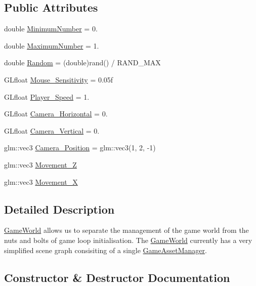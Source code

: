 \subsection*{Public Attributes}
\begin{DoxyCompactItemize}
\item 
double \hyperlink{classGameWorld_a54ccf4cf03172ab8779e9c326c8846ed}{Minimum\+Number} = 0.
\item 
double \hyperlink{classGameWorld_a1cddcf233625a98581eaeb9fd7c8c574}{Maximum\+Number} = 1.
\item 
double \hyperlink{classGameWorld_a56652cc9880b3ba1be61395066c863c3}{Random} = (double)rand() / R\+A\+N\+D\+\_\+\+M\+A\+X
\item 
G\+Lfloat \hyperlink{classGameWorld_a9bf4eb977e6ab9299aaef1345c4fa4dd}{Mouse\+\_\+\+Sensitivity} = 0.\+05f
\item 
G\+Lfloat \hyperlink{classGameWorld_ae8ab2ac372729cec44ea316f6bdf45ca}{Player\+\_\+\+Speed} = 1.
\item 
G\+Lfloat \hyperlink{classGameWorld_a7f4911dda9b3b4e4eb03ece87e16cd96}{Camera\+\_\+\+Horizontal} = 0.
\item 
G\+Lfloat \hyperlink{classGameWorld_a26658e739c4d267b1be35ed820089931}{Camera\+\_\+\+Vertical} = 0.
\item 
glm\+::vec3 \hyperlink{classGameWorld_ad80e597474ea4c52a583e81788187571}{Camera\+\_\+\+Position} = glm\+::vec3(1, 2, -\/1)
\item 
glm\+::vec3 \hyperlink{classGameWorld_a8dd30ba92e7fa9b9b05075e31d1e7dd8}{Movement\+\_\+\+Z}
\item 
glm\+::vec3 \hyperlink{classGameWorld_a968eb29424b68f7cd79a5896c62e944d}{Movement\+\_\+\+X}
\end{DoxyCompactItemize}


\subsection{Detailed Description}
\hyperlink{classGameWorld}{Game\+World} allows us to separate the management of the game world from the nuts and bolts of game loop initialisation. The \hyperlink{classGameWorld}{Game\+World} currently has a very simplified scene graph consisiting of a single \hyperlink{classGameAssetManager}{Game\+Asset\+Manager}. 

\subsection{Constructor \& Destructor Documentation}
\hypertarget{classGameWorld_a17a84e57a80600961088afc753036f89}{}
